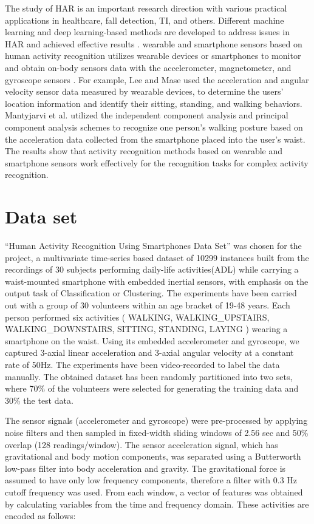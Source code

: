 \documentclass[12pt,conference]{IEEEtran}
\begin{document}
The study of HAR is an important research direction with various practical applications in healthcare, fall detection, TI, and others. Different machine learning and deep learning-based methods are developed to address issues in HAR and achieved effective results \cite{22chen2019towards}. wearable and smartphone sensors based on human activity recognition utilizes wearable devices or smartphones to monitor and obtain on-body sensors data with the accelerometer, magnetometer, and gyroscope sensors \cite{23gupta2014feature}. For example, Lee and Mase \cite{24lee2002activity} used the acceleration and angular velocity sensor data measured by wearable devices, to determine the users’ location information and identify their sitting, standing, and walking behaviors. Mantyjarvi et al. \cite{25mantyjarvi2001recognizing} utilized the independent component analysis and principal component analysis schemes to recognize one person’s walking posture based on the acceleration data collected from the smartphone placed into the user’s waist. The results show that activity recognition methods based on wearable and smartphone sensors work effectively for the recognition tasks for complex activity recognition. 



\section{
\textbf{Data set}
}

“Human Activity Recognition Using Smartphones Data Set” was chosen for the project, a multivariate time-series based dataset of 10299 instances built from the recordings of 30 subjects performing daily-life activities(ADL) while carrying a waist-mounted smartphone with embedded inertial sensors, with emphasis on the output task of Classification or Clustering. The experiments have been carried out with a group of 30 volunteers within an age bracket of 19-48 years. Each person performed six activities ( WALKING, WALKING\_UPSTAIRS, WALKING\_DOWNSTAIRS, SITTING, STANDING, LAYING ) wearing a smartphone on the waist. Using its embedded accelerometer and gyroscope, we captured 3-axial linear acceleration and 3-axial angular velocity at a constant rate of 50Hz. The experiments have been video-recorded to label the data manually. The obtained dataset has been randomly partitioned into two sets, where 70\% of the volunteers were selected for generating the training data and 30\% the test data.

The sensor signals (accelerometer and gyroscope) were pre-processed by applying noise filters and then sampled in fixed-width sliding windows of 2.56 sec and 50\% overlap (128 readings/window). The sensor acceleration signal, which has gravitational and body motion components, was separated using a Butterworth low-pass filter into body acceleration and gravity. The gravitational force is assumed to have only low frequency components, therefore a filter with 0.3 Hz cutoff frequency was used. From each window, a vector of features was obtained by calculating variables from the time and frequency domain. These activities are encoded as follows:\\
\end{document}
